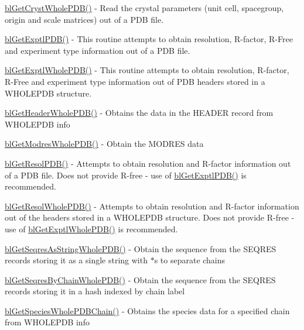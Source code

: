 \begin{DoxyItemize}
\item \hyperlink{_get_cryst_p_d_b_8c_ab2a47c0fab81e876b383555dd37ca942}{bl\-Get\-Cryst\-Whole\-P\-D\-B()} -\/ Read the crystal parameters (unit cell, spacegroup, origin and scale matrices) out of a P\-D\-B file.
\item \hyperlink{pdb_8h_a80f6538fb3e9116b484a44993c62a1a6}{bl\-Get\-Exptl\-P\-D\-B()} -\/ This routine attempts to obtain resolution, R-\/factor, R-\/\-Free and experiment type information out of a P\-D\-B file.
\item \hyperlink{pdb_8h_ae30274ef986cfdd010792451a61ae96b}{bl\-Get\-Exptl\-Whole\-P\-D\-B()} -\/ This routine attempts to obtain resolution, R-\/factor, R-\/\-Free and experiment type information out of P\-D\-B headers stored in a W\-H\-O\-L\-E\-P\-D\-B structure.
\item \hyperlink{pdb_8h_a020709b8b0f9cc91850067b206f79bf2}{bl\-Get\-Header\-Whole\-P\-D\-B()} -\/ Obtains the data in the H\-E\-A\-D\-E\-R record from W\-H\-O\-L\-E\-P\-D\-B info
\item \hyperlink{pdb_8h_a1962f92f359a1015ca08ebe5efcb51fc}{bl\-Get\-Modres\-Whole\-P\-D\-B()} -\/ Obtain the M\-O\-D\-R\-E\-S data
\item \hyperlink{pdb_8h_a35c8f98e52940966707d8004ed8a5826}{bl\-Get\-Resol\-P\-D\-B()} -\/ Attempts to obtain resolution and R-\/factor information out of a P\-D\-B file. Does not provide R-\/free -\/ use of \hyperlink{pdb_8h_a80f6538fb3e9116b484a44993c62a1a6}{bl\-Get\-Exptl\-P\-D\-B()} is recommended.
\item \hyperlink{pdb_8h_a4d5b4d6154f9efed0b1bf00dcb5aa16b}{bl\-Get\-Resol\-Whole\-P\-D\-B()} -\/ Attempts to obtain resolution and R-\/factor information out of the headers stored in a W\-H\-O\-L\-E\-P\-D\-B structure. Does not provide R-\/free -\/ use of \hyperlink{pdb_8h_ae30274ef986cfdd010792451a61ae96b}{bl\-Get\-Exptl\-Whole\-P\-D\-B()} is recommended.
\item \hyperlink{pdb_8h_afe803b05ac022d530cd887ffa0c4834d}{bl\-Get\-Seqres\-As\-String\-Whole\-P\-D\-B()} -\/ Obtain the sequence from the S\-E\-Q\-R\-E\-S records storing it as a single string with $\ast$s to separate chains
\item \hyperlink{pdb_8h_a20dfcd6d2107bffd2d3b92e19b286066}{bl\-Get\-Seqres\-By\-Chain\-Whole\-P\-D\-B()} -\/ Obtain the sequence from the S\-E\-Q\-R\-E\-S records storing it in a hash indexed by chain label
\item \hyperlink{pdb_8h_aa3dde006c07b1fff09030126a6e99d4d}{bl\-Get\-Species\-Whole\-P\-D\-B\-Chain()} -\/ Obtains the species data for a specified chain from W\-H\-O\-L\-E\-P\-D\-B info

\end{DoxyItemize}
